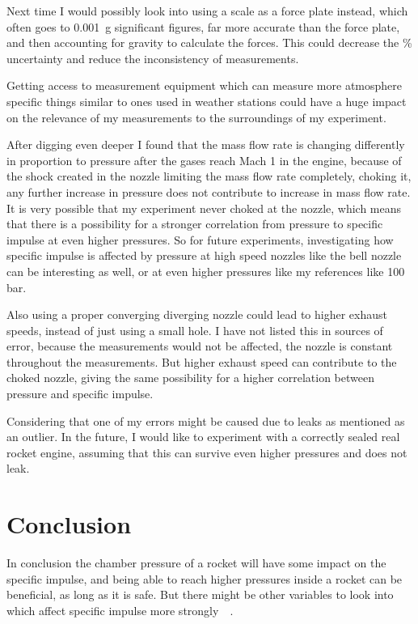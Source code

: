 \documentclass[12pt,a4paper]{article}
\begin{document}
Next time I would possibly look into using a scale as a force plate instead, which often goes to \SI{0.001}{\gram} significant figures, far more accurate than the force plate, and then accounting for gravity to calculate the forces. This could decrease the \% uncertainty and reduce the inconsistency of measurements.

Getting access to measurement equipment which can measure more atmosphere specific things similar to ones used in weather stations could have a huge impact on the relevance of my measurements to the surroundings of my experiment.

After digging even deeper I found that the mass flow rate is changing differently in proportion to pressure after the gases reach Mach 1 in the engine, because of the shock created in the nozzle limiting the mass flow rate completely, choking it, any further increase in pressure does not contribute to increase in mass flow rate. It is very possible that my experiment never choked at the nozzle, which means that there is a possibility for a stronger correlation from pressure to specific impulse at even higher pressures. So for future experiments, investigating how specific impulse is affected by pressure at high speed nozzles like the bell nozzle can be interesting as well, or at even higher pressures like my references like 100 bar.

Also using a proper converging diverging nozzle could lead to higher exhaust speeds, instead of just using a small hole. I have not listed this in sources of error, because the measurements would not be affected, the nozzle is constant throughout the measurements. But higher exhaust speed can contribute to the choked nozzle, giving the same possibility for a higher correlation between pressure and specific impulse.

Considering that one of my errors might be caused due to leaks as mentioned as an outlier. In the future, I would like to experiment with a correctly sealed real rocket engine, assuming that this can survive even higher pressures and does not leak.

\section{Conclusion}

In conclusion the chamber pressure of a rocket will have some impact on the specific impulse, and being able to reach higher pressures inside a rocket can be beneficial, as long as it is safe. But there might be other variables to look into which affect specific impulse more strongly~\cite{erau}~\cite{spacevoyage}.
\end{document}
